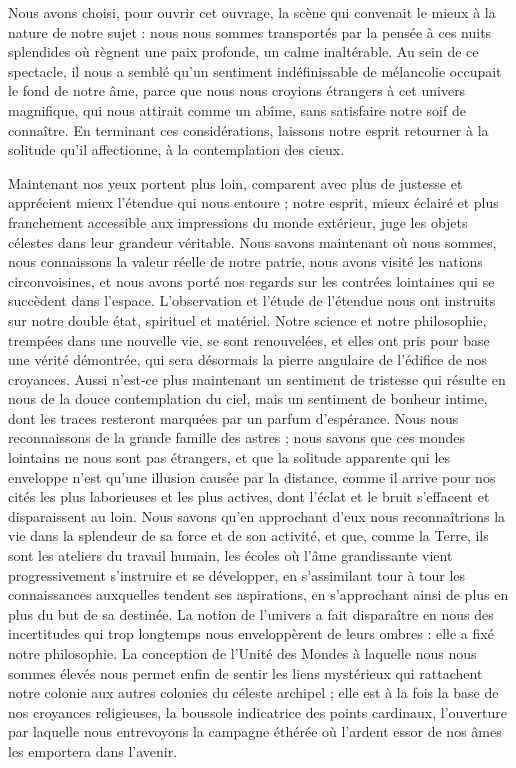 \documentclass[a4paper, 11pt, oneside]{article}
\begin{document}
Nous avons choisi, pour ouvrir cet ouvrage, la scène qui convenait le mieux à la nature de notre sujet : nous nous sommes transportés par la pensée à ces nuits splendides où règnent une paix profonde, un calme inaltérable. Au sein de ce spectacle, il nous a semblé qu'un sentiment indéfinissable de mélancolie occupait le fond de notre âme, parce que nous nous croyions étrangers à cet univers magnifique, qui nous attirait comme un abîme, sans satisfaire notre soif de connaître. En terminant ces considérations, laissons notre esprit retourner à la solitude qu'il affectionne, à la contemplation des cieux.

Maintenant nos yeux portent plus loin, comparent avec plus de justesse et apprécient mieux l'étendue qui nous entoure ; notre esprit, mieux éclairé et plus franchement accessible aux impressions du monde extérieur, juge les objets célestes dans leur grandeur véritable. Nous savons maintenant où nous sommes, nous connaissons la valeur réelle de notre patrie, nous avons visité les nations circonvoisines, et nous avons porté nos regards sur les contrées lointaines qui se succèdent dans l'espace. L'observation et l'étude de l'étendue nous ont instruits sur notre double état, spirituel et matériel. Notre science et notre philosophie, trempées dans une nouvelle vie, se sont renouvelées, et elles ont pris pour base une vérité démontrée, qui sera désormais la pierre angulaire de l'édifice de nos croyances. Aussi n'est-ce plus maintenant un sentiment de tristesse qui résulte en nous de la douce contemplation du ciel, mais un sentiment de bonheur intime, dont les traces resteront marquées par un parfum d'espérance. Nous nous reconnaissons de la grande famille des astres ; nous savons que ces mondes lointains ne nous sont pas étrangers, et que la solitude apparente qui les enveloppe n'est qu'une illusion causée par la distance, comme il arrive pour nos cités les plus laborieuses et les plus actives, dont l'éclat et le bruit s'effacent et disparaissent au loin. Nous savons qu'en approchant d'eux nous reconnaîtrions la vie dans la splendeur de sa force et de son activité, et que, comme la Terre, ils sont les ateliers du travail humain, les écoles où l'âme grandissante vient progressivement s'instruire et se développer, en s'assimilant tour à tour les connaissances auxquelles tendent ses aspirations, en s'approchant ainsi de plus en plus du but de sa destinée. La notion de l'univers a fait disparaître en nous des incertitudes qui trop longtemps nous enveloppèrent de leurs ombres : elle a fixé notre philosophie. La conception de l'Unité des Mondes à laquelle nous nous sommes élevés nous permet enfin de sentir les liens mystérieux qui rattachent notre colonie aux autres colonies du céleste archipel ; elle est à la fois la base de nos croyances religieuses, la boussole indicatrice des points cardinaux, l'ouverture par laquelle nous entrevoyons la campagne éthérée où l'ardent essor de nos âmes les emportera dans l'avenir.
\end{document}

